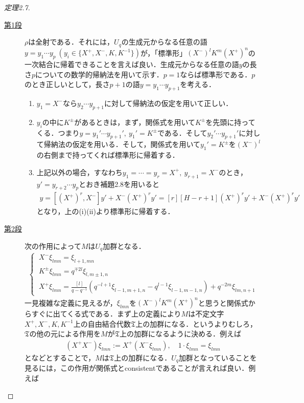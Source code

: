 \documentclass[dvipdfmx]{jsarticle}
\newtheorem{proof}{証明}
\begin{document}
%
%
%
\begin{proof}[定理2.7]
\begin{description}
\item[\underline{第1段}]
$\rho$は全射である．それには，$U_q$の生成元からなる任意の語$y=y_1\cdots y_p{\ }(y_i\in\{X^+,X^-,K,K^{-1}\})$が，「標準形」$(X^-)^lK^m(X^+)^n$の一次結合に帰着できることを言えば良い．生成元からなる任意の語$y$の長さ$p$についての数学的帰納法を用いて示す．$p=1$ならば標準形である．$p$のとき正しいとして，長さ$p+1$の語$y=y_1\cdots y_{p+1}$を考える．
\begin{enumerate}
\renewcommand{\labelenumi}{(\roman{enumi})}
\item $y_1=X^-$なら$y_2\cdots y_{p+1}$に対して帰納法の仮定を用いて正しい．
\item $y_i$の中に$K^\pm$があるときは，まず，関係式を用いて$K^\pm$を先頭に持ってくる．つまり$y=y_1'\cdots y_{p+1}',{\ }y_1'=K^\pm$である．そして$y_2'\cdots y_{p+1}'$に対して帰納法の仮定を用いる．そして，関係式を用いて$y_1'=K^\pm$を$(X^-)^l$の右側まで持ってくれば標準形に帰着する．
\item 上記以外の場合，すなわち$y_1=\cdots=y_r=X^+,{\ }y_{r+1}=X^-$のとき，$y'=y_{r+2}\cdots y_p$とおき補題2.8を用いると
\begin{align*}
y=[(X^+)^r,X^-]y'+X^-(X^+)^r y'=[r][H-r+1](X^+)^r y'+X^-(X^+)^r y'
\end{align*}
となり，上の(i)(ii)より標準形に帰着する．
\end{enumerate}
\item[\underline{第2段}]
次の作用によって$M$は$U_q$加群となる．
\begin{align*}
\begin{cases}
{\ }X^-\xi_{lmn}=\xi_{l+1,mn} \\
{\ }K^\pm\xi_{lmn}=q^{\mp 2l}\xi_{l,m\pm 1,n} \\
\displaystyle {\ }X^+\xi_{lmn}=\frac{[l]}{q-q^{-1}}(q^{-l+1}\xi_{l-1,m+1,n}-q^{l-1}\xi_{l-1,m-1,n})+q^{-2m}\xi_{lm,n+1}
\end{cases}
\end{align*}
一見複雑な定義に見えるが，$\xi_{lmn}$を$(X^-)^lK^m(X^+)^n$と思うと関係式からすぐに出てくる式である．まず上の定義により$M$は不定文字$X^+,X^-,K,K^{-1}$上の自由結合代数$\mathfrak{T}$上の加群になる．というよりむしろ，$\mathfrak{T}$の他の元による作用を$M$が$\mathfrak{T}$上の加群になるように決める．例えば
\begin{align*}
(X^+X^-)\xi_{lmn}:=X^+(X^-\xi_{lmn}),\quad 1\cdot \xi_{lmn}=\xi_{lmn}
\end{align*}
となどとすることで，$M$は$\mathfrak{T}$上の加群になる．$U_q$加群となっていることを見るには，この作用が関係式とconsistentであることが言えれば良い．例えば

\end{description}
\end{proof}
\end{document}
